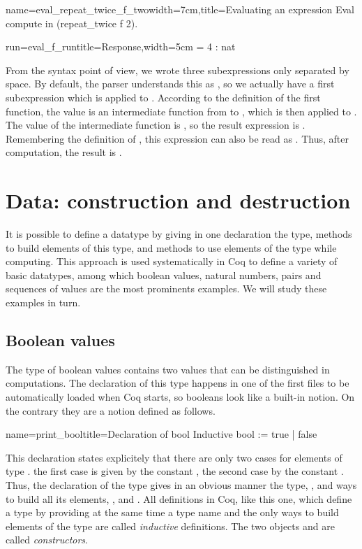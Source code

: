 \begin{coq}{name=eval_repeat_twice_f_two}{width=7cm,title=Evaluating
    an expression}
Eval compute in (repeat_twice f 2).
\end{coq}
\begin{coqout}{run=eval_f_run}{title=Response,width=5cm}
  = 4 : nat
\end{coqout}
From the syntax point of view, we wrote three subexpressions only
separated by space.  By default, the parser understands this as
, so we actually have a first subexpression
which is  applied to .  According to the
definition of the first function, the value is an intermediate
function from 
to , which is then applied to .  The value of the
intermediate function is , so the result
expression is .
Remembering the definition of , this expression can also
be read as .  Thus, after computation, the result is .

\section{Data: construction and destruction}
It is possible to define a datatype by giving in one declaration
the type, methods to build elements of this type, and methods to
use elements of the type while computing.  This approach is used
systematically in Coq to define a variety of basic datatypes, among
which boolean values, natural numbers, pairs and sequences of values
are the most prominents examples.  We will study these examples in
turn.
\subsection{Boolean values}
The type  of boolean values contains two values that can be
distinguished in computations.  The declaration of this type happens
in one of the first files to be automatically loaded when Coq starts,
so booleans look like a built-in notion.  On the contrary they are a
notion defined as follows.

\begin{coq}{name=print_bool}{title=Declaration of bool}
Inductive bool := true | false
\end{coq}
This declaration states explicitely that there are only two cases for
elements of type .  the first case is given by the constant
, the second case by the constant .  Thus, the
declaration of the type gives in an obvious manner the type, ,
and ways to build all its elements, , and .  All definitions
in Coq, like this one, which define a type by providing at the same time a type
name and the only ways to build elements of the type are called {\em inductive}
definitions.  The two objects  and  are called
\emph{constructors}.

